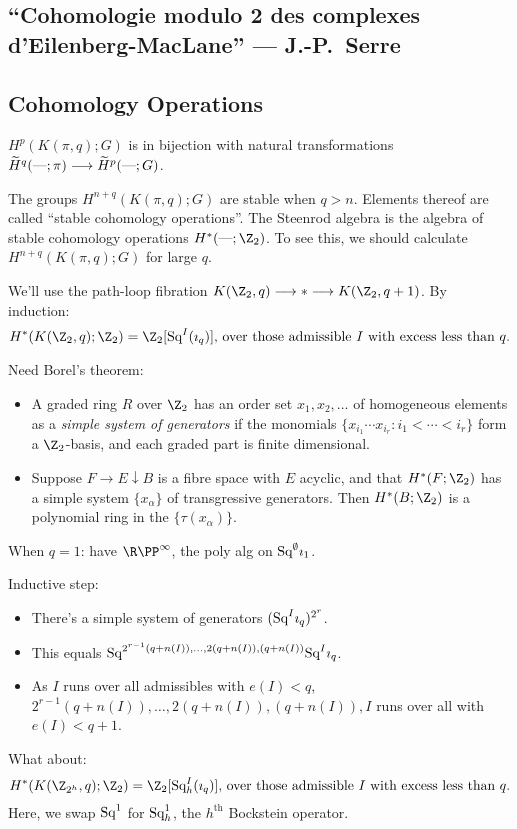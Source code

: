 \documentclass[11pt]{article}
\newcommand{\KanSemResponse}[1]
{
\thispagestyle{fancy}
\subsection*{#1}
}
\begin{document}
\begin{SerreCohModTwoEilMacLane}
\KanSemResponse
{``Cohomologie modulo 2 des complexes d'Eilenberg-MacLane'' --- J.-P.\ Serre}
\subsection*{Cohomology Operations}
\begin{itemise}
\item $H^p(K(\pi,q);G)$ is in bijection with natural transformations $\widetilde H^{q}(\textup{---};\pi)\longrightarrow\widetilde H^{p}(\textup{---};G)$.
\item The groups $H^{n+q}(K(\pi,q);G)$ are stable when $q>n$. Elements thereof are called ``stable cohomology operations''. The Steenrod algebra is the algebra of stable cohomology operations $H^*(\DASH;\Z_2)$. To see this, we should calculate $H^{n+q}(K(\pi,q);G)$ for large $q$.
\item We'll use the path-loop fibration $K(\Z_2,q)\to *\to K(\Z_2,q+1)$. By induction:
\[\text{$H^*(K(\Z_2,q);\Z_2)=\Z_2[\Squ^I(\imath_q)]$, over those admissible $I$ with excess less than $q$.}\]
\item Need Borel's theorem:
\begin{itemize}\squishlist
\item A graded ring $R$ over $\Z_2$ has an order set $x_1,x_2,\ldots$ of homogeneous elements as a \emph{simple system of generators} if the monomials $\{x_{i_1}\cdots x_{i_r}:i_1<\cdots<i_r\}$ form a $\Z_2$-basis, and each graded part is finite dimensional.
\item
Suppose $F\rightarrow E\downarrow B$ is a fibre space with $E$ acyclic, and that $H^*(F;\Z_2)$ has a simple system $\{x_\alpha\}$ of transgressive generators. Then $H^*(B;\Z_2)$ is a polynomial ring in the $\{\tau(x_\alpha)\}$.
\end{itemize}
\item When $q=1$: have $\RP^\infty$, the poly alg on $\textup{Sq}^\emptyset\imath_1$.
\item Inductive step:
\begin{itemize}\squishlist
\item There's a simple system of generators $(\textup{Sq}^I\imath_q)^{2^r}$.
\item This equals $\textup{Sq}^{2^{r-1}(q+n(I)),\ldots,2(q+n(I)),(q+n(I))}\textup{Sq}^I\imath_q$.
\item As $I$ runs over all admissibles with $e(I)<q$, ${2^{r-1}(q+n(I)),\ldots,2(q+n(I)),(q+n(I))},I$ runs over all with $e(I)<q+1$.
\end{itemize}
\item What about:
\[\text{$H^*(K(\Z_{2^h},q);\Z_2)=\Z_2[\Squ^I_h(\imath_q)]$, over those admissible $I$ with excess less than $q$.}\]
Here, we swap $\textup{Sq}^1$ for $\textup{Sq}^1_h$, the $h^\text{th}$ Bockstein operator.


\end{itemise}
\end{SerreCohModTwoEilMacLane}
\end{document}

